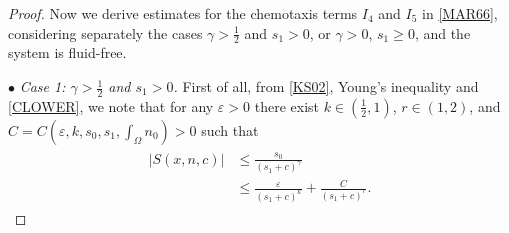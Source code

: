 \documentclass{amsart}
\numberwithin{equation}{section}
\newcommand{\R}{{ \mathbb{R}  }}
\newcommand{\bke}[1]{\left( #1 \right)}
\begin{document}
\begin{proof}



Now we derive estimates for the chemotaxis terms \(I_4\) and \(I_5\) in \eqref{MAR66}, considering separately the cases \(\gamma>\tfrac12\) and \(s_1>0\), or \(\gamma>0\), \(s_1\ge0\), and the system is fluid-free.

$\bullet$ \emph{Case 1: $\gamma>\frac{1}{2}$ and $s_{1}>0$.}
First of all, from \eqref{KS02}, Young's inequality and \eqref{CLOWER}, we note that for any $\varepsilon>0$ there exist $k\in (\frac{1}{2},1)$, $r\in(1,2)$, and  $C=C(\varepsilon, k, s_0, s_1, \int_{\Omega}n_{0})>0$ such that
\begin{align}\label{SSPLIT}
\begin{aligned}
|S(x,n,c)|&\le \frac{s_{0}}{(s_{1}+c)^{\gamma}}
\\&\le \frac{\varepsilon}{(s_{1}+c)^{k}}+\frac{C}{(s_{1}+c)^{r}}.
\end{aligned}
\end{align}


\end{proof}
\end{document}

